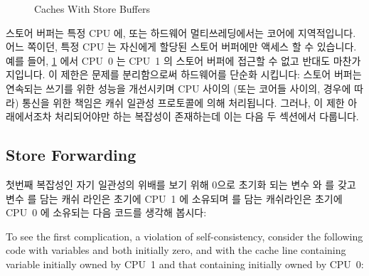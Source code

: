 \begin{figure}[htb]
\centering
{}
\caption{Caches With Store Buffers}
\label{fig:app:whymb:Caches With Store Buffers}
\end{figure}

스토어 버퍼는 특정 CPU 에, 또는 하드웨어 멀티쓰레딩에서는 코어에 지역적입니다.
어느 쪽이던, 특정 CPU 는 자신에게 할당된 스토어 버퍼에만 액세스 할 수 있습니다.
예를 들어,
\cref{fig:app:whymb:Caches With Store Buffers} 에서 CPU~0 는 CPU~1 의 스토어
버퍼에 접근할 수 없고 반대도 마찬가지입니다.
이 제한은 문제를 분리함으로써 하드웨어를 단순화 시킵니다:
스토어 버퍼는 연속되는 쓰기를 위한 성능을 개선시키며 CPU 사이의 (또는 코어들
사이의, 경우에 따라) 통신을 위한 책임은 캐쉬 일관성 프로토콜에 의해 처리됩니다.
그러나, 이 제한 아래에서조차 처리되어야만 하는 복잡성이 존재하는데 이는 다음 두
섹션에서 다룹니다.

\iffalse

These store buffers are local to a given CPU or, on systems with
hardware multithreading, local to a given core.
Either way, a given CPU is permitted to access only the store buffer
assigned to it.
For example, in
\cref{fig:app:whymb:Caches With Store Buffers}, CPU~0 cannot
access CPU~1's store buffer and vice versa.
This restriction simplifies the hardware by separating concerns:
The store buffer improves performance for consecutive writes, while
the responsibility for communicating among CPUs (or cores, as the
case may be) is fully shouldered by the cache-coherence protocol.
However, even given this restriction, there are complications that must
be addressed, which are covered in the next two sections.

\fi

\subsection{Store Forwarding}
\label{sec:app:whymb:Store Forwarding}

첫번째 복잡성인 자기 일관성의 위배를 보기 위해 0으로 초기화 되는 변수 
와  를 갖고 변수  를 담는 캐쉬 라인은 초기에 CPU~1 에 소유되며
 를 담는 캐쉬라인은 초기에 CPU~0 에 소유되는 다음 코드를 생각해 봅시다:

\iffalse

To see the first complication, a violation of self-consistency,
consider the following code with variables  and  both initially
zero, and with the cache line containing variable  initially
owned by CPU~1 and that containing  initially owned by CPU~0:

